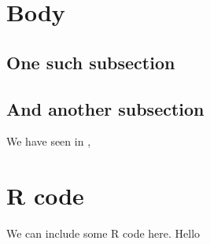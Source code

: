 \documentclass[english, 11pt]{article}\usepackage[]{graphicx}\usepackage[]{color}
\begin{document}
\section{Body}

\lipsum[4]

\subsection{One such subsection}

\lipsum[5-8]

\subsection{And another subsection}

We have seen in \cite{jamil2017}, \lipsum[9]

\section{R code}

We can include some R code here. Hello
\end{document}

